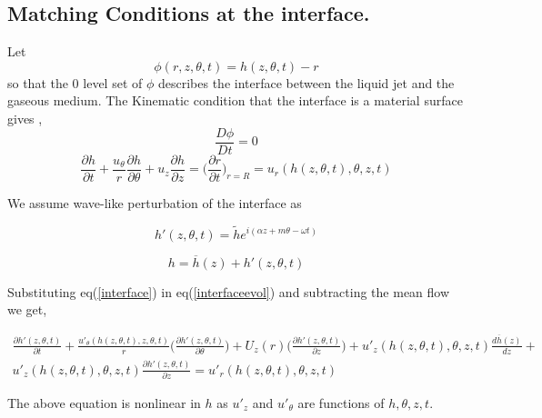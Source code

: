 \documentclass{article}
\begin{document}
\subsection{Matching Conditions at the interface.}
Let
\begin{equation}
\phi(r,z,\theta,t) = h(z,\theta,t) - r
\end{equation}
so that the 0 level set of $\phi $ describes the interface between the liquid jet and the gaseous medium. The  Kinematic  condition that the interface is a material surface gives ,
\begin{equation}
\frac{D\phi}{Dt} = 0
\end{equation}
\begin{equation}
\label{interfaceevol}
\frac{\partial{h}}{\partial{t}} + \frac{u_{\theta}}{r}\frac{\partial{h}}{\partial{\theta}} + u_{z}\frac{\partial{h}}{\partial{z}} = \Bigg(\frac{\partial{r}}{\partial{t}}\Bigg)_{r=R} = u_{r}(h(z,\theta,t),\theta ,z,t)
\end{equation}

We assume wave-like perturbation of the interface as 

\begin{equation}
\label{interface}
h'(z,\theta,t) = \tilde{h}e^{i(\alpha z + m\theta - \omega t)}
 \end{equation}


\begin{equation}
h = \overline h(z) + h'(z,\theta,t)
\end{equation}

Substituting eq(\ref{interface}) in eq(\ref{interfaceevol}) and subtracting the mean flow  we get,

\begin{equation}
\begin{split}
\frac{\partial h'(z,\theta ,t)}{\partial t} + \frac{u'_{\theta}(h(z,\theta, t),z,\theta,t)}{r}\bigg(\frac{\partial h'(z ,\theta,t)}{\partial \theta}\bigg)  +  U_{z}(r)\bigg(\frac{\partial h'(z,\theta ,t)}{\partial z}\bigg) + u'_{z}(h(z,\theta,t),\theta,z,t)\frac{d\overline{h}(z)}{dz} + \\
 u'_{z}(h(z,\theta,t),\theta,z,t)\frac{\partial h'(z,\theta,t)}{\partial z} =  u'_{r}(h(z,\theta,t),\theta ,z,t)
\end{split}
\end{equation}


The above equation is nonlinear in $h$ as $ u'_{z}$ and $ u'_{\theta}$ are functions of $ h,\theta,z,t$.
\end{document}
